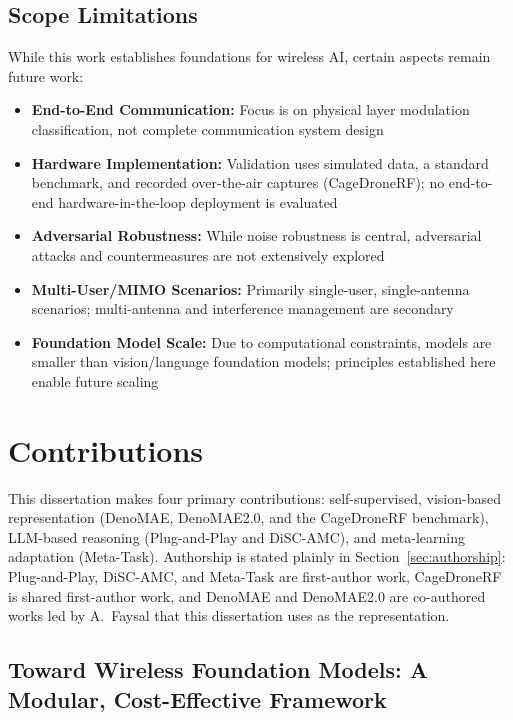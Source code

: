 \subsection{Scope Limitations}

While this work establishes foundations for wireless AI, certain aspects remain future work:
\begin{itemize}
    \item \textbf{End-to-End Communication:} Focus is on physical layer modulation classification, not complete communication system design
    \item \textbf{Hardware Implementation:} Validation uses simulated data, a standard benchmark, and recorded over-the-air captures (CageDroneRF); no end-to-end hardware-in-the-loop deployment is evaluated
    \item \textbf{Adversarial Robustness:} While noise robustness is central, adversarial attacks and countermeasures are not extensively explored
    \item \textbf{Multi-User/MIMO Scenarios:} Primarily single-user, single-antenna scenarios; multi-antenna and interference management are secondary
    \item \textbf{Foundation Model Scale:} Due to computational constraints, models are smaller than vision/language foundation models; principles established here enable future scaling
\end{itemize}

\section{Contributions} \label{sec:contributions}

This dissertation makes four primary contributions: self-supervised, vision-based representation (DenoMAE, DenoMAE2.0, and the CageDroneRF benchmark), LLM-based reasoning (Plug-and-Play and DiSC-AMC), and meta-learning adaptation (Meta-Task). Authorship is stated plainly in Section~\ref{sec:authorship}: Plug-and-Play, DiSC-AMC, and Meta-Task are first-author work, CageDroneRF is shared first-author work, and DenoMAE and DenoMAE2.0 are co-authored works led by A.~Faysal that this dissertation uses as the representation.

\subsection{Toward Wireless Foundation Models: A Modular, Cost-Effective Framework}
\label{subsec:unified_framework}

